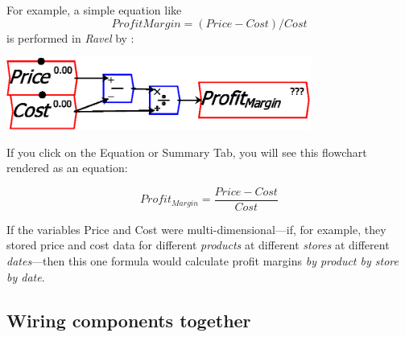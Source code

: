 For example, a simple equation like 
\[
ProfitMargin=(Price-Cost)/Cost
\]
is performed in \emph{Ravel} by :
\begin{center}
\includegraphics[width=10cm]{images/ProfitMarginEquation} 
\par\end{center}

If you click on the Equation or Summary Tab, you will see this flowchart
rendered as an equation:

\[
Profit_{Margin}=\frac{Price-Cost}{Cost}
\]

If the variables Price and Cost were multi-dimensional---if, for
example, they stored price and cost data for different \emph{products}
at different \emph{stores} at different \emph{dates}---then this
one formula would calculate profit margins \emph{by product by store
by date}.

\subsection{Wiring components together}

